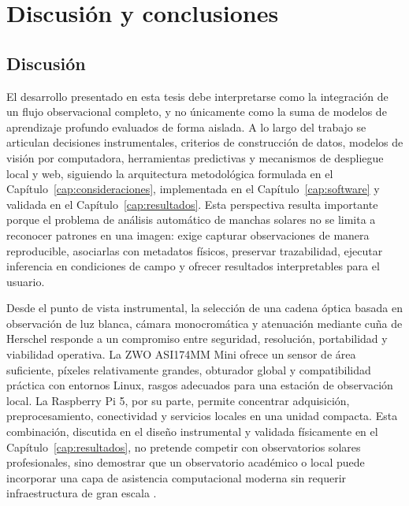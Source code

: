 \chapter[Discusión y conclusiones]{Discusión y conclusiones\label{cap:discusion}}

\section{Discusión}

\label{sec:discussion}

El desarrollo presentado en esta tesis debe interpretarse como la integración de
un flujo observacional completo, y no únicamente como la suma de modelos de
aprendizaje profundo evaluados de forma aislada. A lo largo del trabajo se
articulan decisiones instrumentales, criterios de construcción de datos,
modelos de visión por computadora, herramientas predictivas y mecanismos de
despliegue local y web, siguiendo la arquitectura metodológica formulada en el
Capítulo~\ref{cap:consideraciones}, implementada en el Capítulo~\ref{cap:software}
y validada en el Capítulo~\ref{cap:resultados}. Esta perspectiva resulta importante
porque el problema de análisis automático de manchas solares no se limita a
reconocer patrones en una imagen: exige capturar observaciones de manera
reproducible, asociarlas con metadatos físicos, preservar trazabilidad, ejecutar
inferencia en condiciones de campo y ofrecer resultados interpretables para el
usuario.

Desde el punto de vista instrumental, la selección de una cadena óptica basada en
observación de luz blanca, cámara monocromática y atenuación mediante cuña de
Herschel responde a un compromiso entre seguridad, resolución, portabilidad y
viabilidad operativa. La ZWO ASI174MM Mini ofrece un sensor de área suficiente,
píxeles relativamente grandes, obturador global y compatibilidad práctica con
entornos Linux, rasgos adecuados para una estación de observación local. La
Raspberry Pi 5, por su parte, permite concentrar adquisición, preprocesamiento,
conectividad y servicios locales en una unidad compacta. Esta combinación,
discutida en el diseño instrumental y validada físicamente en el
Capítulo~\ref{cap:resultados}, no pretende competir con observatorios solares
profesionales, sino demostrar que un observatorio académico o local puede
incorporar una capa de asistencia computacional moderna sin requerir
infraestructura de gran escala \citep{zwoASI174Manual2025,luntWhiteLightWedges2026,raspberryPi5Docs2026}.

